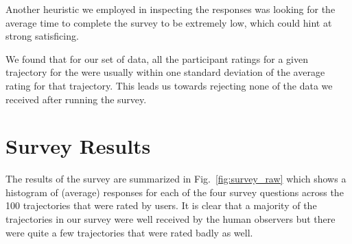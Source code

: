 \documentclass[letterpaper, 10 pt, conference]{ieeeconf}  %
\begin{document}
Another heuristic we employed in inspecting the responses was looking for the average time to complete the survey to be extremely low, which could hint at strong satisficing.

We found that for our set of data, all the participant ratings for a given trajectory for the were usually within one standard deviation of the average rating for that trajectory. This leads us towards rejecting none of the data we received after running the survey.

\section{Survey Results}
\label{sec:analysis}
The results of the survey are summarized in Fig.~\ref{fig:survey_raw} which shows a histogram of (average) responses for each of the four survey questions across the 100 trajectories that were rated by users. It is clear that a majority of the trajectories in our survey were well received by the human observers but there were quite a few trajectories that were rated badly as well. 
\end{document}
